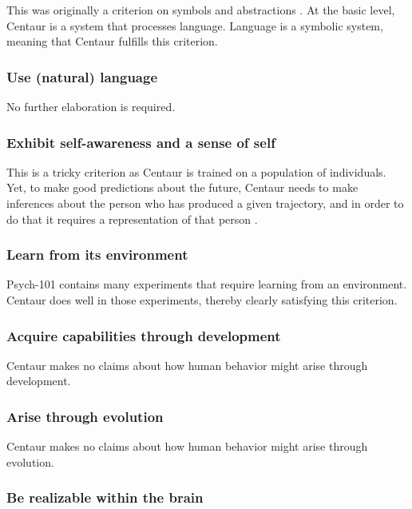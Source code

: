 \documentclass[pdflatex,sn-nature]{sn-jnl}%
\theoremstyle{thmstyleone}%
\theoremstyle{thmstyletwo}%
\theoremstyle{thmstylethree}%
\begin{document}
This was originally a criterion on symbols and abstractions \cite{Newell1990-NEWUTO}. At the basic level, Centaur is a system that processes language. Language is a symbolic system, meaning that Centaur fulfills this criterion.

\subsubsection*{Use (natural) language}

No further elaboration is required.

\subsubsection*{Exhibit self-awareness and a sense of self}

This is a tricky criterion as Centaur is trained on a population of individuals. Yet, to make good predictions about the future, Centaur needs to make inferences about the person who has produced a given trajectory, and in order to do that it requires a representation of that person \cite{andreas-2022-language}.

\subsubsection*{Learn from its environment}

Psych-101 contains many experiments that require learning from an environment. Centaur does well in those experiments, thereby clearly satisfying this criterion.

\subsubsection*{Acquire capabilities through development}

Centaur makes no claims about how human behavior might arise through development.

\subsubsection*{Arise through evolution}

Centaur makes no claims about how human behavior might arise through evolution.

\subsubsection*{Be realizable within the brain}
\end{document}
